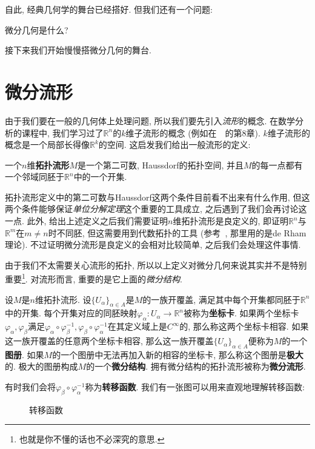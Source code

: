 自此, 经典几何学的舞台已经搭好.
但我们还有一个问题: \label{intro_sect}
\begin{pro}
    微分几何是什么?
\end{pro}
接下来我们开始慢慢搭微分几何的舞台.

\section{微分流形}
由于我们要在一般的几何体上处理问题, 所以我们要先引入\textit{流形}的概念.
在数学分析的课程中, 我们学习过了$\mathbb{R}^n$的$k$维子流形的概念 (例如在~\parencite{Zorich_MathAnal}~的第8章).
$k$维子流形的概念是一个局部长得像$\mathbb{R}^k$的空间.
这启发我们给出一般流形的定义:
\begin{defn}
    一个$n$维\textbf{拓扑流形}$M$是一个第二可数, Haussdorf的拓扑空间, 并且$M$的每一点都有一个邻域同胚于$\mathbb{R}^n$中的一个开集.
\end{defn}
\begin{rem}
    拓扑流形定义中的第二可数与Haussdorf这两个条件目前看不出来有什么作用, 但这两个条件能够保证\textit{单位分解定理}这个重要的工具成立, 之后遇到了我们会再讨论这一点.
    此外, 给出上述定义之后我们需要证明$n$维拓扑流形是良定义的, 即证明$\mathbb{R}^n$与$\mathbb{R}^m$在$m\neq n$时不同胚, 但这需要用到代数拓扑的工具 (参考~\parencite[定理 17.26]{Lee_IntroSmMani}, 那里用的是de Rham理论).
    不过证明微分流形是良定义的会相对比较简单, 之后我们会处理这件事情.
\end{rem}
由于我们不太需要关心流形的拓扑, 所以以上定义对微分几何来说其实并不是特别重要\footnote{也就是你不懂的话也不必深究的意思.}.
对流形而言, 重要的是它上面的\textit{微分结构}.
\begin{defn}
    设$M$是$n$维拓扑流形.
    设$\{U_\alpha\}_{\alpha\in A}$是$M$的一族开覆盖, 满足其中每个开集都同胚于$\mathbb{R}^n$中的开集.
    每个开集对应的同胚映射$\varphi_\alpha:U_\alpha\to\mathbb{R}^n$被称为\textbf{坐标卡}.
    如果两个坐标卡$\varphi_\alpha,\varphi_\beta$满足$\varphi_\alpha\circ\varphi_\beta^{-1},\varphi_\beta\circ\varphi_\alpha^{-1}$在其定义域上是$C^\infty$的, 那么称这两个坐标卡相容.
    如果这一族开覆盖的任意两个坐标卡相容, 那么这一族开覆盖$\{U_\alpha\}_{\alpha\in A}$便称为$M$的一个\textbf{图册}.
    如果$M$的一个图册中无法再加入新的相容的坐标卡, 那么称这个图册是\textbf{极大}的.
    极大的图册构成$M$的一个\textbf{微分结构}.
    拥有微分结构的拓扑流形被称为\textbf{微分流形}.
\end{defn}
有时我们会将$\varphi_\beta\circ\varphi_\alpha^{-1}$称为\textbf{转移函数}.
我们有一张图可以用来直观地理解转移函数:
\begin{figure}[ht]
    \centering
    
    \caption{转移函数}
\end{figure}

